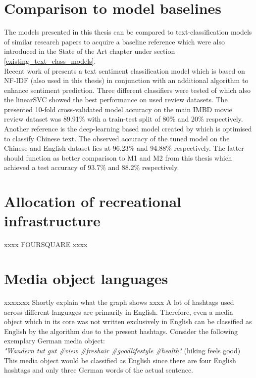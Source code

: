 \section{Comparison to model baselines} \label{model_baseline}
The models presented in this thesis can be compared to text-classification models of similar research papers to acquire a baseline reference which were also introduced in the State of the Art chapter under section \ref{existing_text_class_models}. \\
Recent work of \textcite{Das2018} presents a text sentiment classification model which is based on NF-IDF (also used in this thesis) in conjunction with an additional algorithm to enhance sentiment prediction. Three different classifiers were tested of which also the linearSVC showed the best performance on used review datasets. The presented 10-fold cross-validated model accuracy on the main IMBD movie review dataset was 89.91\% with a train-test split of 80\% and 20\% respectively.\\
Another reference is the deep-learning based model created by \textcite{Li2018} which is optimised to classify Chinese text. The observed accuracy of the tuned model on the Chinese and English dataset lies at 96.23\% and 94.88\% respectively. The latter should function as better comparison to M1 and M2 from this thesis which achieved a test accuracy of 93.7\% and 88.2\% respectively.

\section{Allocation of recreational infrastructure}
xxxx FOURSQUARE xxxx

\section{Media object languages}
xxxxxxx Shortly explain what the graph shows xxxx
A lot of hashtags used across different languages are primarily in English. Therefore, even a media object which in its core was not written exclusively in English can be classified as English by the algorithm due to the present hashtags. Consider the following exemplary German media object: \\ \textit{"Wandern tut gut \#view \#freshair \#goodlifestyle \#health"} (hiking feels good) \\ This media object would be classified as English since there are four English hashtags and only three German words of the actual sentence.

